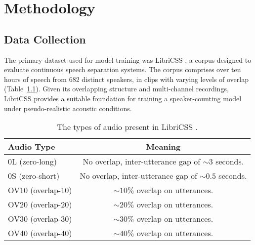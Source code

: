 
\chapter{Methodology}

\section{Data Collection}
The primary dataset used for model training was LibriCSS \cite{libricss}, a corpus designed to evaluate continuous speech separation systems. The corpus comprises over ten hours of speech from 682 distinct speakers, in clips with varying levels of overlap (Table~\ref{tab:LibriCSS}). Given its overlapping structure and multi-channel recordings, LibriCSS provides a suitable foundation for training a speaker-counting model under pseudo-realistic acoustic conditions.

\begin{table}[H]
  \centering
  \caption{The types of audio present in LibriCSS \cite{libricss}.}
  \label{tab:LibriCSS}
  \begin{tabular}{|l|c|}
    \hline
    \textbf{Audio Type} & \textbf{Meaning} \\
    \hline
    0L (zero-long) & No overlap, inter-utterance gap of $\sim3$ seconds. \\
    \hline
    0S (zero-short) & No overlap, inter-utterance gap of $\sim0.5$ seconds. \\
    \hline
    OV10 (overlap-10) & $\sim10\%$ overlap on utterances. \\
    \hline
    OV20 (overlap-20) & $\sim20\%$ overlap on utterances. \\
    \hline
    OV30 (overlap-30) & $\sim30\%$ overlap on utterances. \\
    \hline
    OV40 (overlap-40) & $\sim40\%$ overlap on utterances. \\
    \hline
  \end{tabular}
\end{table}

